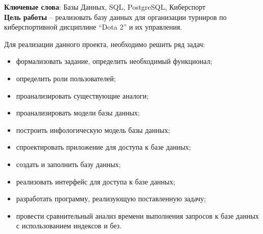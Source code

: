
\noindent\textbf{Ключевые слова}: Базы Данных, SQL, PostgreSQL, Киберспорт\\


\textbf{Цель работы} – реализовать базу данных 	для организации турниров по киберспортивной дисциплине “Dota 2” и их управления.

Для реализации данного проекта, необходимо решить ряд задач:
\begin{itemize}
	\item формализовать задание, определить необходимый функционал;
	\item определить роли пользователей;
	\item проанализировать существующие аналоги;
	\item проанализировать модели базы данных;
	\item построить инфологическую модель базы данных;
	\item спроектировать приложение для доступа к базе данных;
	\item создать и заполнить базу данных;
	\item реализовать интерфейс для доступа к базе данных;
	\item разработать программу, реализующую поставленную задачу;
	\item провести сравнительный анализ времени выполнения запросов к базе данных с использованием индексов и без.
\end{itemize}

%
